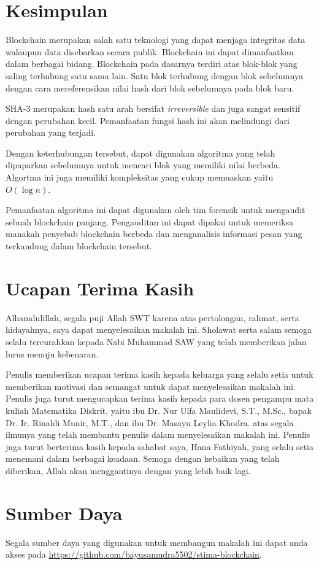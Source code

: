 \documentclass[10pt,conference]{IEEEtran}
\theoremstyle{definition}
\begin{document}
\section{Kesimpulan}
Blockchain merupakan salah satu teknologi yang dapat menjaga integritas data walaupun data disebarkan secara publik. Blockchain ini dapat dimanfaatkan dalam berbagai bidang. Blockchain pada dasarnya terdiri atas blok-blok yang saling terhubung satu sama lain. Satu blok terhubung dengan blok sebelumnya dengan cara mereferensikan nilai hash dari blok sebelumnya pada blok baru.

SHA-3 merupakan hash satu arah bersifat \emph{irreversible} dan juga sangat sensitif dengan perubahan kecil. Pemanfaatan fungsi hash ini akan melindungi dari perubahan yang terjadi. 

Dengan keterhubungan tersebut, dapat digunakan algoritma yang telah dipaparkan sebelumnya untuk mencari blok yang memiliki nilai berbeda. Algortma ini juga memiliki kompleksitas yang cukup memuaskan yaitu $O(\log n)$.

Pemanfaatan algoritma ini dapat digunakan oleh tim forensik untuk mengaudit sebuah blockchain panjang. Pengauditan ini dapat dipakai untuk memeriksa manakah penyebab blockchain berbeda dan menganalisis informasi pesan yang terkandung dalam blockchain tersebut. 

\section*{Ucapan Terima Kasih}
Alhamdulillah, segala puji Allah SWT karena atas pertolongan, rahmat, serta hidayahnya, saya dapat menyelesaikan makalah ini. Sholawat serta salam semoga selalu tercurahkan kepada Nabi Muhammad SAW yang telah memberikan jalan lurus menuju kebenaran. 

Penulis memberikan ucapan terima kasih kepada keluarga yang selalu setia untuk
memberikan motivasi dan semangat untuk dapat menyelesaikan makalah ini. Penulis juga turut mengucapkan terima kasih kepada para dosen pengampu mata kuliah Matematika Diskrit, yaitu ibu Dr. Nur Ulfa Maulidevi, S.T., M.Sc., bapak Dr. Ir.
Rinaldi Munir, M.T., dan ibu Dr. Masayu Leylia Khodra. atas segala ilmunya yang telah membantu penulis dalam menyelesaikan makalah ini. Penulis juga turut berterima kasih kepada sahabat saya, Hana Fathiyah, yang selalu setia menemani dalam berbagai keadaan. Semoga dengan kebaikan yang telah diberikan, Allah akan menggantinya dengan yang lebih baik lagi.

\section*{Sumber Daya}
Segala sumber daya yang digunakan untuk membangun makalah ini dapat anda akses pada \url{https://github.com/bayusamudra5502/stima-blockchain}.
\end{document}
